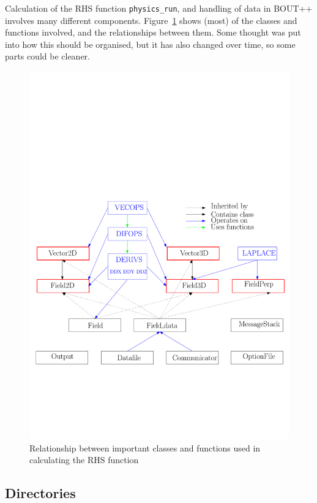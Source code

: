 \documentclass[12pt]{article}
\newcommand{\code}[1]{\texttt{#1}}
\begin{document}
Calculation of the RHS function \code{physics\_run}, and handling of data
in BOUT++ involves many different components. Figure~\ref{fig:layout2}
shows (most) of the classes and functions involved, and the relationships
between them. Some thought was put into how this should be organised, but
it has also changed over time, so some parts could be cleaner.
\begin{figure}[htbp!]
\centering
\includegraphics[width=0.6\paperwidth, keepaspectratio]{figs/layout2.pdf}
\caption{Relationship between important classes and functions used in calculating the RHS function}
\label{fig:layout2}
\end{figure}

\subsection{Directories}
\end{document}
